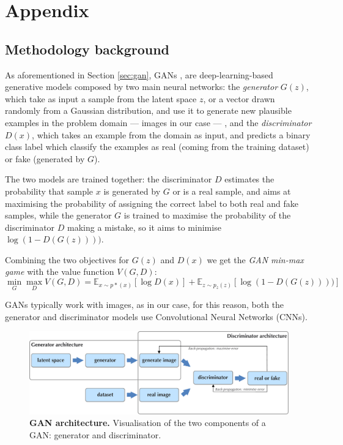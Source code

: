 \documentclass{article}
\begin{document}
	
	\clearpage
	\appendix
	\section{Appendix}\label{sec:appendix}
	
	
	\subsection{Methodology background} \label{subsec:app_background}
	
	As aforementioned in Section \ref{sec:gan}, GANs \cite{goodfellow2014generative}, are 
	deep-learning-based generative models composed by two main neural networks: 
	the \textit{generator} ${G(z)}$, which take as input a sample from the latent space $z$, or a vector 
	drawn randomly from a Gaussian distribution, and use it to generate new plausible examples in the 
	problem domain — images in our case — , and the \textit{discriminator} ${D(x)}$, which takes an 
	example from the domain as input, and predicts a binary class label which classify the examples as 
	real (coming from the training dataset) or fake (generated by $G$). 
	
	The two models are trained together: the discriminator $D$ estimates the probability that 
	sample $x$ is generated by $G$ or is a real sample, and aims at maximising the probability of 
	assigning the correct label to both real and fake samples, while the generator $G$ is trained to 
	maximise the probability of the discriminator $D$ making a mistake, so it aims to minimise 
	$\log(1-D(G(z))))$.
	
	Combining the two objectives for $G(z)$ and $D(x)$ we get the \textit{GAN min-max game} with the 
	value function $V(G,D)$:
	\begin{equation}
		\label{e:minmaxgame}
		\min_G \max_D V(G,D) = 
		\mathbb{E}_{x \sim p*(x)} [\log D(x)] + \mathbb E _{z \sim p_z(z)} [\log (1-D(G(z))))]
	\end{equation}
	
	GANs typically work with images, as in our case, for this reason, both the generator and 
	discriminator models use Convolutional Neural Networks (CNNs).
	\begin{figure}[htb]				
		\centering
		\includegraphics[width=.65\linewidth]{images/GAN}
		\caption{\textbf{GAN architecture.} Visualisation of the two components of a GAN: generator and 
			discriminator.}
		\label{fig:gan}
	\end{figure}
	
\end{document}
